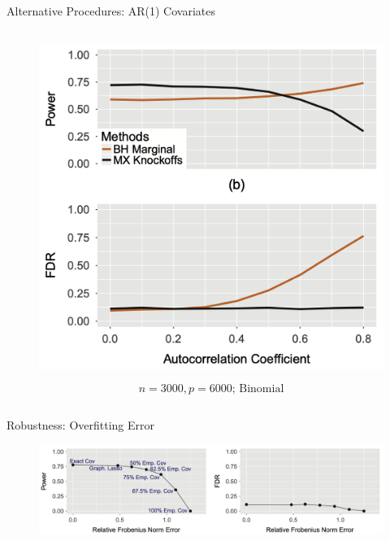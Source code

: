 \begin{frame}{Alternative Procedures: AR(1) Covariates}
{\begin{columns}[T]
        \begin{column}{0.45\textwidth}
            \begin{figure}\label{fig:procedure4_b}
                \centering
                \includegraphics[height = 0.7\textheight]{images/altproced_4_b.png}
            \end{figure}
            \vspace*{-10pt}
            $$ n=3000,p=6000\text{; Binomial} $$
        \end{column}
    \end{columns}}
\end{frame}

\begin{frame}{Robustness: Overfitting Error}
    \begin{figure}\label{fig:robust1}
        \centering
        \includegraphics[width = 0.95 \textwidth]{images/robust1.png}
    \end{figure}
\end{frame}

